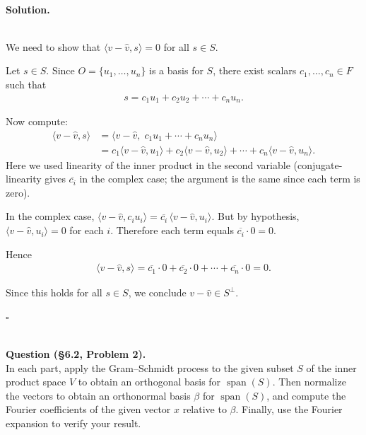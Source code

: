 \documentclass{article}
\begin{document}
\noindent\\
\textbf{Solution.}\\
\quad\\
\begin{mdframed}[linewidth=1pt]
We need to show that $\langle v - \hat{v}, s \rangle = 0$ for all $s \in S$.

Let $s \in S$. Since $O = \{u_1, \dots, u_n\}$ is a basis for $S$, there exist scalars $c_1, \dots, c_n \in F$ such that
\begin{align*}
s = c_1 u_1 + c_2 u_2 + \cdots + c_n u_n.
\end{align*}

Now compute:
\begin{align*}
\langle v - \hat{v}, s \rangle
&= \langle v - \hat{v},\; c_1 u_1 + \cdots + c_n u_n \rangle \\
&= c_1 \langle v - \hat{v}, u_1 \rangle + c_2 \langle v - \hat{v}, u_2 \rangle + \cdots + c_n \langle v - \hat{v}, u_n \rangle.
\end{align*}
Here we used linearity of the inner product in the second variable (conjugate-linearity gives $\overline{c_i}$ in the complex case; the argument is the same since each term is zero).

In the complex case, $\langle v - \hat{v}, c_i u_i \rangle = \overline{c_i}\, \langle v - \hat{v}, u_i \rangle$. But by hypothesis, $\langle v - \hat{v}, u_i \rangle = 0$ for each $i$. Therefore each term equals $\overline{c_i} \cdot 0 = 0$.

Hence
\begin{align*}
\langle v - \hat{v}, s \rangle = \overline{c_1} \cdot 0 + \overline{c_2} \cdot 0 + \cdots + \overline{c_n} \cdot 0 = 0.
\end{align*}

Since this holds for all $s \in S$, we conclude $v - \hat{v} \in S^\perp$.

\hfill $\square$
\end{mdframed}

\bigskip

\hfill \break  $~\!\!$ \dotfill \medskip \\
\textbf{Question (\S6.2, Problem 2).}\\
In each part, apply the Gram--Schmidt process to the given subset $S$ of the inner product space $V$ to obtain an orthogonal basis for $\operatorname{span}(S)$. Then normalize the vectors to obtain an orthonormal basis $\beta$ for $\operatorname{span}(S)$, and compute the Fourier coefficients of the given vector $x$ relative to $\beta$. Finally, use the Fourier expansion to verify your result.
\end{document}
